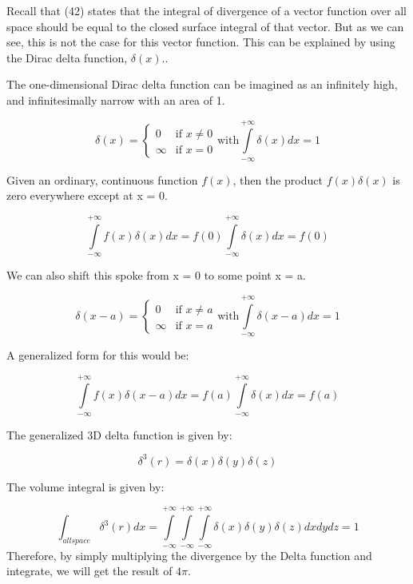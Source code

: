 Recall that (42) states that the integral of divergence of a vector function over all space should be equal to the closed surface integral of that vector. But as we can see, this is not the case for this vector function. This can be explained by using the Dirac delta function, \( \delta(x). \).

The one-dimensional Dirac delta function can be imagined as an infinitely high, and infinitesimally narrow with an area of 1. 

\begin{equation}
\delta(x) =\begin{cases}
0 & \text{if } x \neq 0\\
\infty & \text{if } x= 0
\end{cases} \mathrm{with } \int\limits_{-\infty}^{+\infty}\delta(x)dx = 1
\end{equation}

Given an ordinary, continuous function \( f(x) \), then the product \( f(x)\delta(x) \) is zero everywhere except at x = 0.

\begin{equation}
\int\limits_{-\infty}^{+\infty}f(x)\delta(x)dx = f(0)\int\limits_{-\infty}^{+\infty}\delta(x)dx = f(0)
\end{equation}

We can also shift this spoke from x = 0 to some point x = a.


\begin{equation}
\delta(x-a) =\begin{cases}
0 & \text{if } x \neq a\\
\infty & \text{if } x= a
\end{cases} \mathrm{with }\int\limits_{-\infty}^{+\infty}\delta(x-a)dx = 1
\end{equation}

A generalized form for this would be:

\begin{equation}
\int\limits_{-\infty}^{+\infty}f(x)\delta(x-a)dx = f(a)\int\limits_{-\infty}^{+\infty}\delta(x)dx = f(a)
\end{equation}

The generalized 3D delta function is given by:

\begin{equation}
\delta^3(r)=\delta(x)\delta(y)\delta(z)
\end{equation}

The volume integral is given by:

\begin{equation}
\int_{all space} \delta^3(r)dx=\int\limits_{-\infty}^{+\infty}\int\limits_{-\infty}^{+\infty}\int\limits_{-\infty}^{+\infty}\delta(x)\delta(y)\delta(z)dxdydz = 1
\end{equation}
 Therefore, by simply multiplying the divergence by the Delta function and integrate, we will get the result of \( 4\pi \).
 
